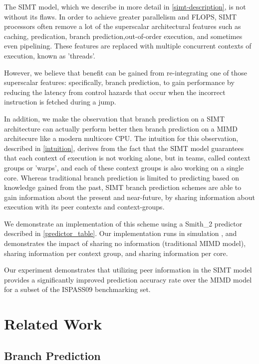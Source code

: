 \documentclass[conference]{IEEEtran}
\begin{document}
The SIMT model, which we describe in more detail in \ref{simt-description}, is not without its flaws.  In order to achieve greater parallelism and 
FLOPS, SIMT processors often remove a lot of the superscalar architectural features such as caching, predication, branch prediction,out-of-order execution, and sometimes even pipelining.
These features are replaced with multiple concurrent contexts of execution, known as 'threads'.

However, we believe that benefit can be gained from re-integrating one of those superscalar features: specifically, branch prediction, to gain 
performance by reducing the latency from control hazards that occur when the incorrect instruction is fetched during a jump.  

In addition, we make the observation that branch prediction on a SIMT architecture can actually perform better then branch prediction on a MIMD architecure like a modern multicore CPU.
The intuition for this observation, described in \ref{intuition}, derives from the fact that the SIMT model guarantees that each context of execution
is not working alone, but in teams, called context groups or 'warps', and each of these context groups is also working on a single core.  Whereas traditional branch prediction
is limited to predicting based on knowledge gained from the past, SIMT branch prediction schemes are able to gain information about the present and near-future, by sharing information
about execution with its peer contexts and context-groups.

We demonstrate an implementation of this scheme using a Smith\_2 predictor described in \ref{predictor_table}.  Our implementation runs in simulation \cite{ispass09},
and demonstrates the impact of sharing no information (traditional MIMD model), sharing information per context group, and sharing information per core.

Our experiment demonstrates that utilizing peer information in the SIMT model provides a significantly improved prediction accuracy rate over the MIMD model
for a subset of the ISPASS09 \cite{ispass09} benchmarking set.

\section{Related Work}

\subsection{Branch Prediction}
\end{document}
